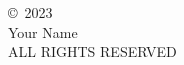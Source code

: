 \thispagestyle{empty}
\vspace*{\fill}
\begin{center}
    \copyright\ 2023\\
    Your Name\\
    ALL RIGHTS RESERVED
\end{center}